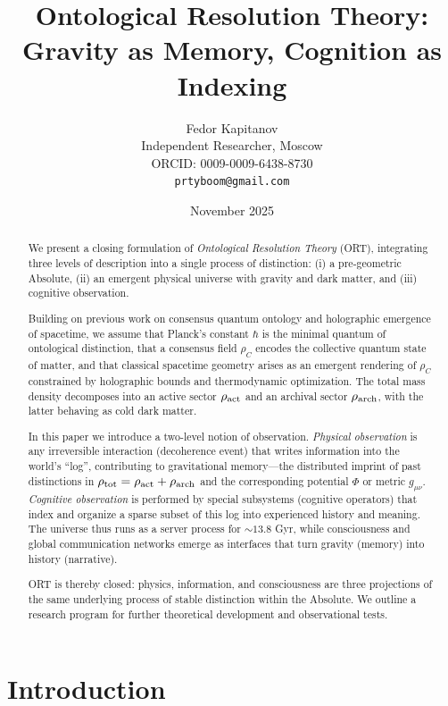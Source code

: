 \documentclass[12pt,a4paper]{article}
\title{\textbf{Ontological Resolution Theory:}\\[0.3em]
Gravity as Memory, Cognition as Indexing}
\author{
Fedor Kapitanov\\[0.3em]
\small Independent Researcher, Moscow\\
\small ORCID: 0009-0009-6438-8730\\
\small \texttt{prtyboom@gmail.com}
}
\date{November 2025}
\begin{document}
\maketitle

\begin{abstract}
We present a closing formulation of \emph{Ontological Resolution Theory} (ORT), integrating three levels of description into a single process of distinction: (i) a pre-geometric Absolute, (ii) an emergent physical universe with gravity and dark matter, and (iii) cognitive observation.

Building on previous work on consensus quantum ontology and holographic emergence of spacetime, we assume that Planck's constant $\hbar$ is the minimal quantum of ontological distinction, that a consensus field $\rho_C$ encodes the collective quantum state of matter, and that classical spacetime geometry arises as an emergent rendering of $\rho_C$ constrained by holographic bounds and thermodynamic optimization. The total mass density decomposes into an active sector $\rho_{\rm act}$ and an archival sector $\rho_{\rm arch}$, with the latter behaving as cold dark matter.

In this paper we introduce a two-level notion of observation. \emph{Physical observation} is any irreversible interaction (decoherence event) that writes information into the world's ``log'', contributing to gravitational memory---the distributed imprint of past distinctions in $\rho_{\rm tot} = \rho_{\rm act} + \rho_{\rm arch}$ and the corresponding potential $\Phi$ or metric $g_{\mu\nu}$. \emph{Cognitive observation} is performed by special subsystems (cognitive operators) that index and organize a sparse subset of this log into experienced history and meaning. The universe thus runs as a server process for $\sim 13.8$ Gyr, while consciousness and global communication networks emerge as interfaces that turn gravity (memory) into history (narrative).

ORT is thereby closed: physics, information, and consciousness are three projections of the same underlying process of stable distinction within the Absolute. We outline a research program for further theoretical development and observational tests.
\end{abstract}

\tableofcontents
\newpage

\section{Introduction}
\label{sec:intro}
\end{document}

